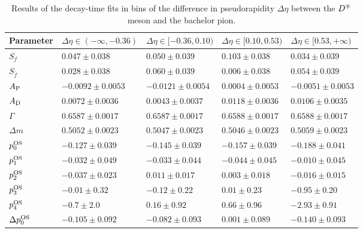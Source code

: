 \begin{table}
  \centering
  \caption{Results of the decay-time fits in bins of the difference in pseudorapidity $\Delta\eta$ between the $D^\mp$ meson and the bachelor pion.}
  \label{tab:timesplitsDeltaEta}
    \begin{tabular}{lllll}
      \toprule
      Parameter & $\Delta\eta\in(-\infty,-0.36)$ & $\Delta\eta\in[-0.36,0.10)$ & $\Delta\eta\in[0.10,0.53)$ & $\Delta\eta\in[0.53,+\infty)$ \\
      \midrule
      $S_{f}$               &   $0.047\pm0.038$      & $0.050\pm0.039$      & $0.103\pm0.038$      & $0.034\pm0.039$       \\ 
      $S_{\bar f}$          &   $0.028\pm0.038$      & $0.060\pm0.039$      & $0.006\pm0.038$      & $0.054\pm0.039$       \\
      \midrule
      $A_{\rm P}$               &   $-0.0092\pm0.0053$    & $-0.0121\pm0.0054$    & $0.0004\pm0.0053$     & $-0.0051\pm0.0053$     \\ 
      $A_{\rm D}$               &   $0.0072\pm0.0036$     & $0.0043\pm0.0037$     & $0.0118\pm0.0036$     & $0.0106\pm0.0035$      \\ 
      \midrule
      $\Gamma$              &   $0.6587\pm0.0017$     & $0.6587\pm0.0017$     & $0.6588\pm0.0017$     & $0.6588\pm0.0017$      \\ 
      $\Delta m$            &   $0.5052\pm0.0023$     & $0.5047\pm0.0023$     & $0.5046\pm0.0023$     & $0.5059\pm0.0023$      \\
      \midrule
      $p_{0}^{\rm OS}$             &   $-0.127\pm0.039$      & $-0.145\pm0.039$      & $-0.157\pm0.039$      & $-0.188\pm0.041$       \\ 
      $p_{1}^{\rm OS}$             &   $-0.032\pm0.049$      & $-0.033\pm0.044$      & $-0.044\pm0.045$      & $-0.010\pm0.045$       \\ 
      $p_{2}^{\rm OS}$             &   $-0.037\pm0.023$      & $0.011\pm0.017$       & $0.003\pm0.018$       & $-0.016\pm0.015$       \\ 
      $p_{3}^{\rm OS}$             &   $-0.01\pm0.32$        & $-0.12\pm0.22$        & $0.01\pm0.23$         & $-0.95\pm0.20$         \\ 
      $p_{4}^{\rm OS}$             &   $-0.7\pm2.0$          & $0.16\pm0.92$         & $0.66\pm0.96$         & $-2.93\pm0.91$         \\ 
      $\Delta p_{0}^{\rm OS}$      &   $-0.105\pm0.092$      & $-0.082\pm0.093$      & $0.001\pm0.089$       & $-0.140\pm0.093$       \\ 

\end{tabular}
\end{table}
